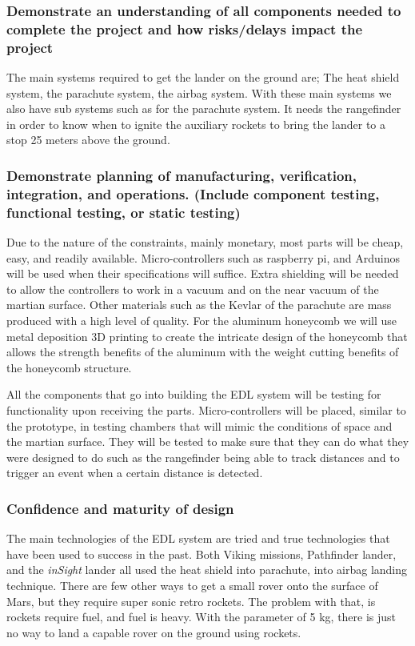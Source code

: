\documentclass[%
 portrait,
 aapm,
 mph,%
 amsmath,amssymb,
 reprint,%
]{revtex4-2}
\begin{document}
\subsubsection{Demonstrate an understanding of all components needed to complete
the project and how risks/delays impact the project}
The main systems required to get the lander on the ground are; The heat shield system, the parachute system, the airbag system.  With these main systems we also have sub systems such as for the parachute system.  It needs the rangefinder in order to know when to ignite the auxiliary rockets to bring the lander to a stop 25 meters above the ground.

\subsubsection{Demonstrate planning of manufacturing, verification, integration, and operations. (Include component testing, functional testing, or static testing)}
Due to the nature of the constraints, mainly monetary, most parts will be cheap, easy, and readily available.  Micro-controllers such as raspberry pi, and Arduinos will be used when their specifications will suffice.  Extra shielding will be needed to allow the controllers to work in a vacuum and on the near vacuum of the martian surface.  Other materials such as the Kevlar of the parachute are mass produced with a high level of quality.  For the aluminum honeycomb we will use metal deposition 3D printing to create the intricate design of the honeycomb that allows the strength benefits of the aluminum with the weight cutting benefits of the honeycomb structure.

All the components that go into building the EDL system will be testing for functionality upon receiving the parts.  Micro-controllers will be placed, similar to the prototype, in testing chambers that will mimic the conditions of space and the martian surface.  They will be tested to make sure that they can do what they were designed to do such as the rangefinder being able to track distances and to trigger an event when a certain distance is detected.

\subsubsection{Confidence and maturity of design}
The main technologies of the EDL system are tried and true technologies that have been used to success in the past.  Both Viking missions, Pathfinder lander, and the \textit{inSight} lander all used the heat shield into parachute, into airbag landing technique.  There are few other ways to get a small rover onto the surface of Mars, but they require super sonic retro rockets.  The problem with that, is rockets require fuel, and fuel is heavy.  With the parameter of 5 kg, there is just no way to land a capable rover on the ground using rockets.
\end{document}
